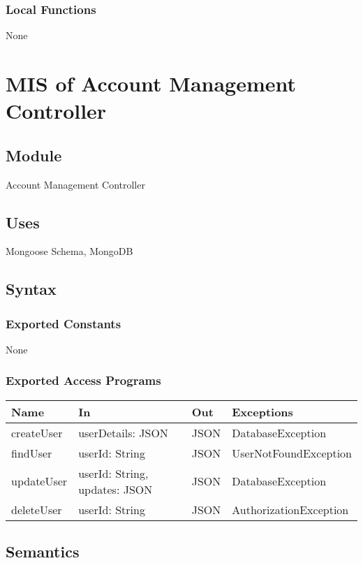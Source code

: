 \documentclass[12pt, titlepage]{article}
\begin{document}
\subsubsection{Local Functions}
None

\section{MIS of Account Management Controller} \label{AccountManagementController}

\subsection{Module}
Account Management Controller

\subsection{Uses}
Mongoose Schema, MongoDB

\subsection{Syntax}

\subsubsection{Exported Constants}
None

\subsubsection{Exported Access Programs}

\begin{center}
\begin{tabular}{p{2cm} p{4cm} p{2cm} p{4cm}}
\hline
\textbf{Name} & \textbf{In} & \textbf{Out} & \textbf{Exceptions} \\
\hline
createUser & userDetails: JSON & JSON & DatabaseException \\
findUser & userId: String & JSON & UserNotFoundException \\
updateUser & userId: String, updates: JSON & JSON & DatabaseException \\
deleteUser & userId: String & JSON & AuthorizationException \\
\hline
\end{tabular}
\end{center}

\subsection{Semantics}
\end{document}
